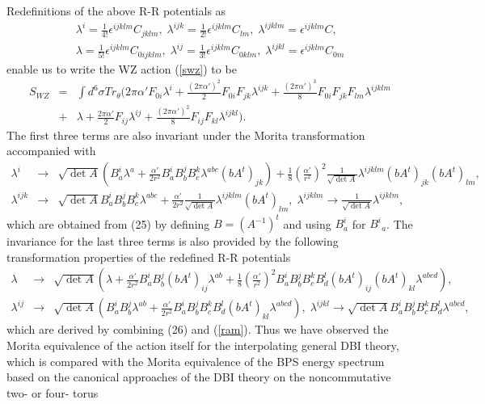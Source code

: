 \documentclass[12pt,a4paper]{article}
\newcommand{\al}{\alpha'}
\newcommand{\e}{\epsilon}
\newcommand{\te}{\theta}
\newcommand{\la}{\lambda}
\begin{document}
Redefinitions of the above R-R  potentials as 
\begin{eqnarray}
\la^i = \frac{1}{4!}\e^{ijklm}C_{jklm}, \; \la^{ijk} = \frac{1}{2!}
\e^{ijklm}C_{lm}, \; \la^{ijklm}=\e^{ijklm}C, \nonumber \\
\la =\frac{1}{5!}\e^{ijklm}C_{0ijklm},\; \la^{ij} = \frac{1}{3!}
\e^{ijklm}C_{0klm}, \; \la^{ijkl}=\e^{ijklm}C_{0m}
\label{ram}\end{eqnarray}
enable us to write the WZ action (\ref{swz}) to be
\begin{eqnarray}
S_{WZ} &=& \int d^6\sigma Tr_{\te}(2\pi\al F_{0i}\la^i + 
\frac{(2\pi\al)^2}{2}F_{0i}F_{jk}\la^{ijk} + \frac{(2\pi\al)^3}{8}
F_{0i}F_{jk}F_{lm}\la^{ijklm} \nonumber \\
&+& \la + \frac{2\pi\al}{2}F_{ij}\la^{ij} + \frac{(2\pi\al)^2}{8}
F_{ij}F_{kl}\la^{ijkl} ).
\end{eqnarray}
The first three terms are also invariant under the Morita transformation
accompanied with 
\begin{eqnarray}
\la^i &\rightarrow& \sqrt{\det A}(B_a^{i}\la^a + \frac{\al}{2r^2}
B_a^iB_b^jB_c^k\la^{abc}(bA^t)_{jk}) + \frac{1}{8} (\frac{\al}{r^2})^2
\frac{1}{\sqrt{\det A}}\la^{ijklm}(bA^t)_{jk}(bA^t)_{lm}, \nonumber \\
\la^{ijk} &\rightarrow& \sqrt{\det A}B_a^i B_b^j B_c^k \la^{abc} +
\frac{\al}{2r^2} \frac{1}{\sqrt{\det A}}\la^{ijklm}(bA^t)_{lm}, \;
\la^{ijklm} \rightarrow \frac{1}{\sqrt{\det A}}\la^{ijklm},
\label{tra}\end{eqnarray}
which are obtained from (25) by defining $B =(A^{-1})^t$ and
using $B_a^i$ for $B_{\:\:a}^i$. The
invariance for the last three terms is also provided by the
following transformation properties of the redefined R-R potentials
\begin{eqnarray}
\la &\rightarrow& \sqrt{\det A}(\la + \frac{\al}{2r^2}B_a^i B_b^j
(bA^t)_{ij}\la^{ab}  + \frac{1}{8}
(\frac{\al}{r^2})^2B_a^i B_b^j B_c^k B_d^l
(bA^t)_{ij}(bA^t)_{kl}\la^{abcd}),  \\
\la^{ij} &\rightarrow& \sqrt{\det A}(B_a^i B_b^j \la^{ab} + 
\frac{\al}{2r^2}B_a^i B_b^j B_c^k B_d^l(bA^t)_{kl}\la^{abcd}),\;
\la^{ijkl} \rightarrow \sqrt{\det A}B_a^i B_b^j B_c^k B_d^l\la^{abcd},
\nonumber
\end{eqnarray}
which are derived by combining (26) and (\ref{ram}). 
Thus we have observed the Morita equivalence of the action itself
for the interpolating general DBI theory, which is compared with
the Morita equivalence of the BPS energy spectrum  based on the canonical
approaches of the DBI theory on the noncommutative two- or four- torus
\end{document}
